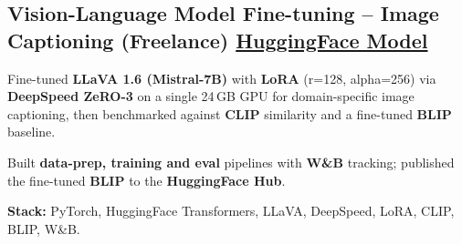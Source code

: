 \documentclass[letter,10pt]{article}
\begin{document}
\subsection{Vision-Language Model Fine-tuning – Image Captioning (Freelance) \hfill \href{https://huggingface.co/sunil448832/blip-model}{HuggingFace Model}}
\begin{zitemize}
\item Fine-tuned \textbf{LLaVA 1.6 (Mistral-7B)} with \textbf{LoRA} (r=128, alpha=256) via \textbf{DeepSpeed ZeRO-3} on a single 24\,GB GPU for domain-specific image captioning, then benchmarked against \textbf{CLIP} similarity and a fine-tuned \textbf{BLIP} baseline.
\item Built \textbf{data-prep, training and eval} pipelines with \textbf{W\&B} tracking; published the fine-tuned \textbf{BLIP} to the \textbf{HuggingFace Hub}.
\item \textbf{Stack:} PyTorch, HuggingFace Transformers, LLaVA, DeepSpeed, LoRA, CLIP, BLIP, W\&B.
\end{zitemize}
\end{document}
